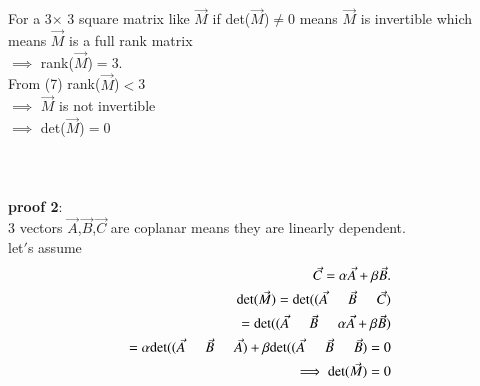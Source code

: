 \documentclass[journal]{IEEEtran}
\begin{document}
For a 3$\times$ 3  square matrix like $\Vec{M}$ if det($\Vec{M}$)$\neq$0 means $\Vec{M}$ is invertible which means $\Vec{M}$ is a full rank matrix\\ 
$\implies$ rank($\Vec{M}$)$=$3.\\ 
From (7) rank($\Vec{M}$)$<$3 \\
$\implies$ $\Vec{M}$ is not invertible\\
$\implies$ det($\Vec{M}$)$=$0\\ \\ \\  \\
\textbf{proof 2}:\\
 3 vectors $\Vec{A}$,$\Vec{B}$,$\Vec{C}$ are coplanar means they are linearly dependent.\\
 let$'$s assume
 \begin{align}
     \Vec{C}=\alpha \Vec{A}+\beta \Vec{B}.\\
     \text{det}(\Vec{M})=\text{det}((\Vec{A} \hspace{0.5cm} \Vec{B} \hspace{0.5cm} \Vec{C})\\
 =\text{det}((\Vec{A} \hspace{0.5cm} \Vec{B} \hspace{0.5cm} \alpha \Vec{A}+\beta \Vec{B})\\
 =\alpha \text{det}((\Vec{A} \hspace{0.5cm} \Vec{B} \hspace{0.5cm} \Vec{A}) + \beta \text{det}((\Vec{A} \hspace{0.5cm} \Vec{B} \hspace{0.5cm} \Vec{B})=0\\
 \implies \text{det}(\Vec{M})=0
 \end{align}
\end{document}
